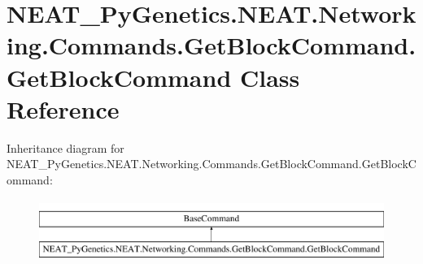 \hypertarget{classNEAT__PyGenetics_1_1NEAT_1_1Networking_1_1Commands_1_1GetBlockCommand_1_1GetBlockCommand}{}\section{N\+E\+A\+T\+\_\+\+Py\+Genetics.\+N\+E\+A\+T.\+Networking.\+Commands.\+Get\+Block\+Command.\+Get\+Block\+Command Class Reference}
\label{classNEAT__PyGenetics_1_1NEAT_1_1Networking_1_1Commands_1_1GetBlockCommand_1_1GetBlockCommand}
Inheritance diagram for N\+E\+A\+T\+\_\+\+Py\+Genetics.\+N\+E\+A\+T.\+Networking.\+Commands.\+Get\+Block\+Command.\+Get\+Block\+Command\+:\begin{figure}[H]
\begin{center}
\leavevmode
\includegraphics[height=2.000000cm]{classNEAT__PyGenetics_1_1NEAT_1_1Networking_1_1Commands_1_1GetBlockCommand_1_1GetBlockCommand}
\end{center}
\end{figure}

